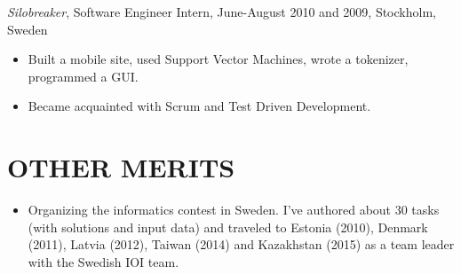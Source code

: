 \documentclass[11pt]{res} %
\begin{document}
\begin{resume}
\begin{itemize}
 \end{itemize}


 \emph{Silobreaker}, {\footnotesize Software Engineer Intern, June-August 2010 and 2009}, Stockholm, Sweden
\vspace{0.2in}
 \begin{itemize} %
  \item Built a mobile site, used Support Vector Machines, wrote a tokenizer,
   programmed a GUI.
  \item Became acquainted with Scrum and Test Driven Development.
\end{itemize}

\section{OTHER MERITS}

\begin{itemize} %
  \item Organizing the informatics contest in Sweden.  I've authored about
    30 tasks (with solutions and input data) and traveled to Estonia (2010),
    Denmark (2011), Latvia (2012), Taiwan (2014) and Kazakhstan (2015) as a
    team leader with the Swedish IOI team.
\end{itemize}

\end{resume}
\end{document}
